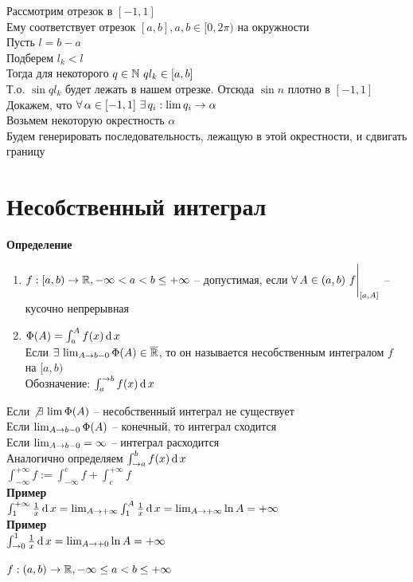 \documentclass[12pt]{article}
\begin{document}
Рассмотрим отрезок в $[-1, 1]$\\
Ему соответствует отрезок $[a,b], a,b \in [0,2\pi)$ на окружности\\
Пусть $l = b-a$\\
Подберем $l_k < l$\\
Тогда для некоторого $q \in \mathbb{N}\ ql_k\in [a,b]$\\
Т.о. $\sin ql_k$ будет лежать в нашем отрезке. Отсюда $\sin n$ плотно в $[-1, 1]$\\
Докажем, что $\forall\, \alpha\in [-1, 1]\ \exists\, q_i: \lim q_i \rightarrow \alpha$\\
Возьмем некоторую окрестность $\alpha$\\
Будем генерировать последовательность, лежащую в этой окрестности, и сдвигать границу
\section{Несобственный интеграл}
\textbf{Определение}
\begin{enumerate}
    \item $f: [a, b) \rightarrow \mathbb{R}, -\infty < a < b \leq +\infty$ -- допустимая, если $\forall\, A \in (a, b)\ f\Biggr|_{[a,A]}$ -- кусочно непрерывная
    \item $\Phi(A) = \int_a^A f(x)\operatorname{d} x$\\
    Если $\exists\, \lim_{A \rightarrow b-0} \Phi(A) \in \overline{\mathbb{R}}$, то он называется несобственным интегралом $f$ на $[a,b)$\\
    Обозначение: $\int_a^{\rightarrow b} f(x)\operatorname{d} x$
\end{enumerate}
Если $\not\exists\, \lim \Phi(A)$ -- несобственный интеграл не существует\\
Если $\lim_{A \rightarrow b-0} \Phi(A)$ -- конечный, то интеграл сходится\\
Если $\lim_{A \rightarrow b-0} = \infty$ -- интеграл расходится\\
Аналогично определяем $\int_{\rightarrow a}^b f(x)\operatorname{d} x$\\
$\int_{-\infty}^{+\infty} f := \int_{-\infty}^c f + \int_c^{+\infty} f$\\
\textbf{Пример}\\
$\int_1^{+\infty} \frac1x \operatorname{d} x = \lim_{A \rightarrow +\infty} \int_1^A \frac1x\operatorname{d} x = \lim_{A \rightarrow +\infty} \ln A = +\infty$\\
\textbf{Пример}\\
$\int_{\rightarrow 0}^1 \frac1x \operatorname{d} x = \lim_{A\rightarrow +0} \ln A = +\infty$\\\\
$f: (a,b) \rightarrow \mathbb{R}, -\infty \leq a < b \leq +\infty$\\
\end{document}
